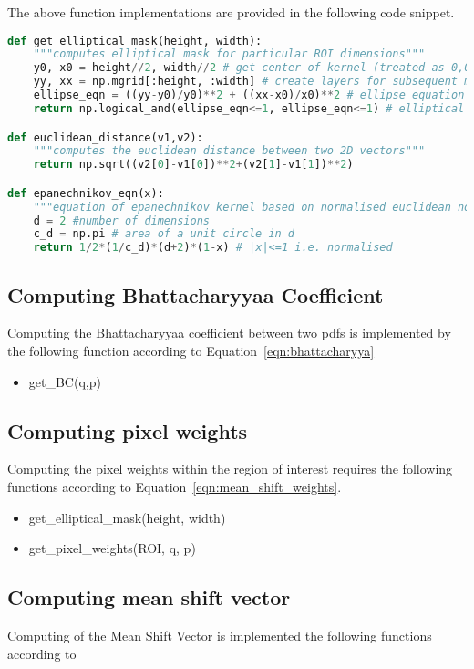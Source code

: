 The above function implementations are provided in the following code snippet.

\begin{lstlisting}[language=Python]
def get_elliptical_mask(height, width):
    """computes elliptical mask for particular ROI dimensions"""
    y0, x0 = height//2, width//2 # get center of kernel (treated as 0,0) - note these are also hy and hx 
    yy, xx = np.mgrid[:height, :width] # create layers for subsequent mask
    ellipse_eqn = ((yy-y0)/y0)**2 + ((xx-x0)/x0)**2 # ellipse equation
    return np.logical_and(ellipse_eqn<=1, ellipse_eqn<=1) # elliptical mask for kernel

def euclidean_distance(v1,v2):
    """computes the euclidean distance between two 2D vectors"""
    return np.sqrt((v2[0]-v1[0])**2+(v2[1]-v1[1])**2)

def epanechnikov_eqn(x):
    """equation of epanechnikov kernel based on normalised euclidean norm squared"""
    d = 2 #number of dimensions
    c_d = np.pi # area of a unit circle in d  
    return 1/2*(1/c_d)*(d+2)*(1-x) # |x|<=1 i.e. normalised
\end{lstlisting}

\subsection{Computing Bhattacharyyaa Coefficient}
Computing the Bhattacharyyaa coefficient between two pdfs is implemented by the
following function according to Equation~\ref{eqn:bhattacharyya}
\begin{itemize}
    \item get\_BC(q,p)
\end{itemize}

\subsection{Computing pixel weights}
Computing the pixel weights within the region of interest requires the following
functions according to Equation~\ref{eqn:mean_shift_weights}.

\begin{itemize}
    \item get\_elliptical\_mask(height, width)
    \item get\_pixel\_weights(ROI, q, p)
\end{itemize}

\subsection{Computing mean shift vector}
Computing of the Mean Shift Vector is implemented the following functions
according to 

